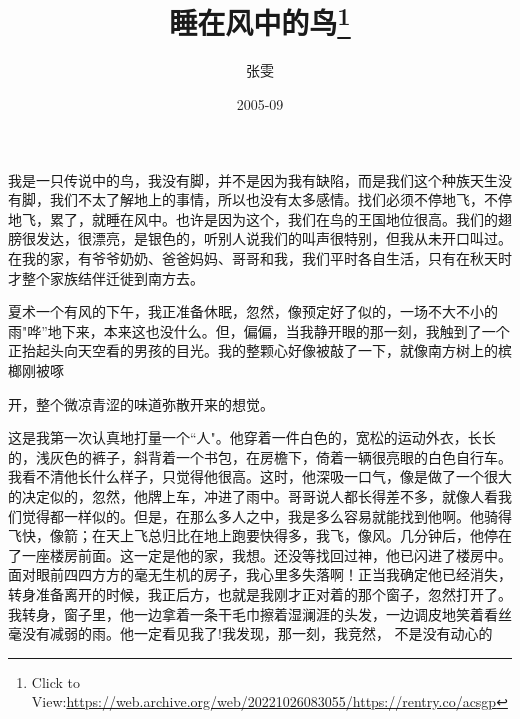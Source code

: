 \documentclass{article}
\title{睡在风中的鸟\footnote{Click to View:\url{https://web.archive.org/web/20221026083055/https://rentry.co/acsgp}}}
\author{张雯}
\date{2005-09}
\begin{document}

\maketitle


\Large

﻿我是一只传说中的鸟，我没有脚，并不是因为我有缺陷，而是我们这个种族天生没有脚，我们不太了解地上的事情，所以也没有太多感情。找们必须不停地飞，不停地飞，累了，就睡在风中。也许是因为这个，我们在鸟的王国地位很高。我们的翅膀很发达，很漂亮，是银色的，听别人说我们的叫声很特别，但我从未开口叫过。在我的家，有爷爷奶奶、爸爸妈妈、哥哥和我，我们平时各自生活，只有在秋天时
才整个家族结伴迁徙到南方去。 

夏术一个有风的下午，我正准备休眠，忽然，像预定好了似的，一场不大不小的雨"哗”地下来，本来这也没什么。但，偏偏，当我静开眼的那一刻，我触到了一个正抬起头向天空看的男孩的目光。我的整颗心好像被敲了一下，就像南方树上的槟榔刚被啄
\newpage

开，整个微凉青涩的味道弥散开来的想觉。 

这是我第一次认真地打量一个“人"。他穿着一件白色的，宽松的运动外衣，长长的，浅灰色的裤子，斜背着一个书包，在房檐下，倚着一辆很亮眼的白色自行车。我看不清他长什么样子，只觉得他很高。这时，他深吸一口气，像是做了一个很大的决定似的，忽然，他牌上车，冲进了雨中。哥哥说人都长得差不多，就像人看我们觉得都一样似的。但是，在那么多人之中，我是多么容易就能找到他啊。他骑得飞快，像箭；在天上飞总归比在地上跑要快得多，我飞，像风。几分钟后，他停在了一座楼房前面。这一定是他的家，我想。还没等找回过神，他已闪进了楼房中。面对眼前四四方方的毫无生机的房子，我心里多失落啊！正当我确定他已经消失，转身准备离开的时候，我正后方，也就是我刚才正对着的那个窗子，忽然打开了。我转身，窗子里，他一边拿着一条干毛巾擦着湿澜涯的头发，一边调皮地笑着看丝毫没有减弱的雨。他一定看见我了!我发现，那一刻，我竞然，
不是没有动心的 

\newpage
\end{document}
